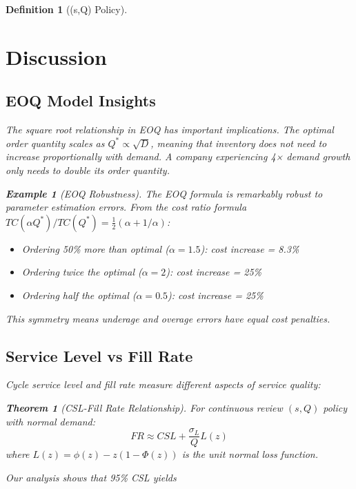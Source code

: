 \documentclass[a4paper, 11pt]{article}
\newtheorem{definition}{Definition}[section]
\newtheorem{theorem}{Theorem}[section]
\newtheorem{example}{Example}[section]
\begin{document}
\begin{definition}[(s,Q) Policy]
\section{Discussion}

\subsection{EOQ Model Insights}

The square root relationship in EOQ has important implications. The optimal order
quantity scales as $Q^* \propto \sqrt{D}$, meaning that inventory does not need to
increase proportionally with demand. A company experiencing 4× demand growth only
needs to double its order quantity.

\begin{example}[EOQ Robustness]
The EOQ formula is remarkably robust to parameter estimation errors. From the cost
ratio formula $TC(\alpha Q^*)/TC(Q^*) = \frac{1}{2}(\alpha + 1/\alpha)$:
\begin{itemize}
\item Ordering 50\% more than optimal ($\alpha = 1.5$): cost increase = 8.3\%
\item Ordering twice the optimal ($\alpha = 2$): cost increase = 25\%
\item Ordering half the optimal ($\alpha = 0.5$): cost increase = 25\%
\end{itemize}
This symmetry means underage and overage errors have equal cost penalties.
\end{example}

\subsection{Service Level vs Fill Rate}

Cycle service level and fill rate measure different aspects of service quality:

\begin{theorem}[CSL-Fill Rate Relationship]
For continuous review $(s,Q)$ policy with normal demand:
\begin{equation}
FR \approx CSL + \frac{\sigma_L}{Q}L(z)
\end{equation}
where $L(z) = \phi(z) - z(1-\Phi(z))$ is the unit normal loss function.
\end{theorem}

Our analysis shows that 95\% CSL yields \py{f"{fill_rates[1]:.2%
99\% CSL achieves \py{f"{fill_rates[3]:.2%
rate narrows as order quantity increases.

}}}}
\end{definition}
\end{document}
